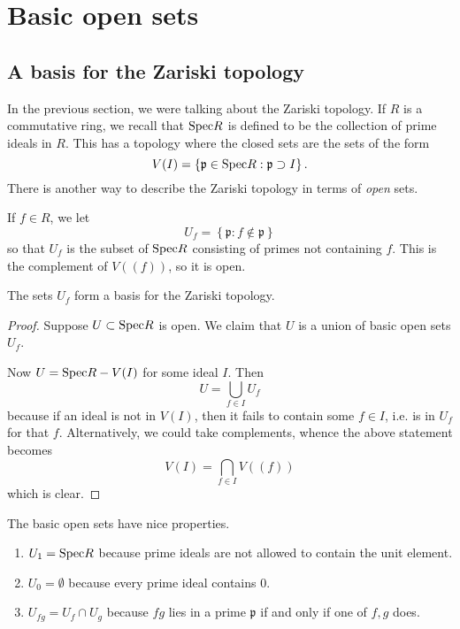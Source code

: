\section{Basic open sets}

\subsection{A basis for the Zariski topology}
In the previous section, we were talking about the Zariski topology. If $R$ is a
commutative ring, we recall that $\mathrm{Spec} R$ is defined to be the collection of
prime ideals in $R$. This has a topology where the closed sets are the sets of
the form
\[ V(I) = \left\{\mathfrak{p} \in \mathrm{Spec} R: \mathfrak{p} \supset I\right\} . \]
There is another way to describe the Zariski topology in terms of
\emph{open} sets.  

\begin{definition} 
If $f \in R$, we let 
\[ U_f = \left\{\mathfrak{p}: f \notin \mathfrak{p}\right\}  \]
so that $U_f$ is the subset of $\mathrm{Spec} R$ consisting of primes not containing
$f$. This is the complement of $V((f))$, so it is open.  
\end{definition} 

\begin{proposition} 
The sets $U_f$ form a basis for the Zariski topology. 
\end{proposition} 

\begin{proof} 
Suppose $U \subset \mathrm{Spec} R$ is open.  We claim that $U$ is a union of basic
open sets $U_f$. 

Now $U = \mathrm{Spec} R - V(I)$ for some ideal $I$.  Then
\[ U = \bigcup_{f \in I} U_f  \]
because if an ideal is not in $V(I)$, then it fails to contain some $f \in I$,
i.e. is in $U_f$ for that $f$. Alternatively, we could take complements, whence
the above statement becomes
\[ V(I) = \bigcap_{f \in I} V((f))  \]
which is clear.
\end{proof} 

The basic open sets have nice properties.
\begin{enumerate}
\item $U_1  = \mathrm{Spec} R$ because prime ideals are not allowed to contain the
unit element. 
\item $U_0 = \emptyset$ because every prime ideal contains $0$.
\item $U_{fg} = U_f \cap U_g$ because $fg$ lies in a prime $\mathfrak{p}$ if and only if one
of $f,g$ does.
\end{enumerate}

